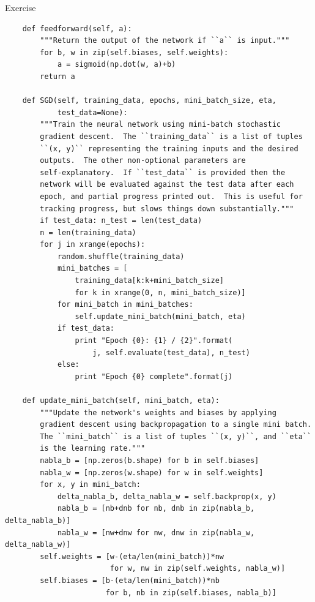 \begin{exerciseBox}{Exercise}
\begin{lstlisting}
    def feedforward(self, a):
        """Return the output of the network if ``a`` is input."""
        for b, w in zip(self.biases, self.weights):
            a = sigmoid(np.dot(w, a)+b)
        return a

    def SGD(self, training_data, epochs, mini_batch_size, eta,
            test_data=None):
        """Train the neural network using mini-batch stochastic
        gradient descent.  The ``training_data`` is a list of tuples
        ``(x, y)`` representing the training inputs and the desired
        outputs.  The other non-optional parameters are
        self-explanatory.  If ``test_data`` is provided then the
        network will be evaluated against the test data after each
        epoch, and partial progress printed out.  This is useful for
        tracking progress, but slows things down substantially."""
        if test_data: n_test = len(test_data)
        n = len(training_data)
        for j in xrange(epochs):
            random.shuffle(training_data)
            mini_batches = [
                training_data[k:k+mini_batch_size]
                for k in xrange(0, n, mini_batch_size)]
            for mini_batch in mini_batches:
                self.update_mini_batch(mini_batch, eta)
            if test_data:
                print "Epoch {0}: {1} / {2}".format(
                    j, self.evaluate(test_data), n_test)
            else:
                print "Epoch {0} complete".format(j)

    def update_mini_batch(self, mini_batch, eta):
        """Update the network's weights and biases by applying
        gradient descent using backpropagation to a single mini batch.
        The ``mini_batch`` is a list of tuples ``(x, y)``, and ``eta``
        is the learning rate."""
        nabla_b = [np.zeros(b.shape) for b in self.biases]
        nabla_w = [np.zeros(w.shape) for w in self.weights]
        for x, y in mini_batch:
            delta_nabla_b, delta_nabla_w = self.backprop(x, y)
            nabla_b = [nb+dnb for nb, dnb in zip(nabla_b, delta_nabla_b)]
            nabla_w = [nw+dnw for nw, dnw in zip(nabla_w, delta_nabla_w)]
        self.weights = [w-(eta/len(mini_batch))*nw
                        for w, nw in zip(self.weights, nabla_w)]
        self.biases = [b-(eta/len(mini_batch))*nb
                       for b, nb in zip(self.biases, nabla_b)]


\end{lstlisting}
\end{exerciseBox}
